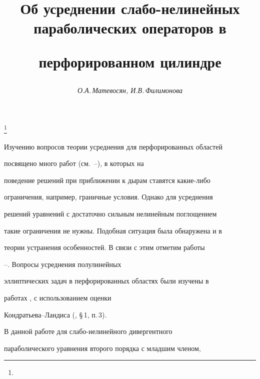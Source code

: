 \author{\it О.А.\,Матевосян, И.В.\,Филимонова}




\title{Об усреднении слабо-нелинейных параболических операторов в


перфорированном цилиндре}


\thanks{}





\date{}




\pagestyle{plain} %







\maketitle


\label{begin}








Изучению вопросов теории усреднения для перфорированных областей


посвящено много работ (см.~\cite{BLP}--\cite{MKh}), в которых на


поведение решений при приближении к дырам ставятся какие-либо


ограничения, например, граничные условия. Однако для усреднения


решений уравнений с достаточно сильным нелинейным поглощением


такие ограничения не нужны. Подобная ситуация была обнаружена и в


теории устранения особенностей. В связи с этим отметим работы


\cite{BF}--\cite{IOK}. Вопросы усреднения полулинейных


эллиптических задач в перфорированных областях были изучены в


работах \cite{MP1}, \cite{MP2} с использованием оценки


Кондратьева--Ландиса (\cite{KL}, \S\,1, п.\,3).





В данной работе для слабо-нелинейного дивергентного


параболического уравнения второго порядка с младшим членом,



